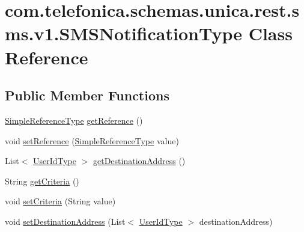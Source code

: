 \hypertarget{classcom_1_1telefonica_1_1schemas_1_1unica_1_1rest_1_1sms_1_1v1_1_1SMSNotificationType}{
\section{com.telefonica.schemas.unica.rest.sms.v1.SMSNotificationType Class Reference}
\label{classcom_1_1telefonica_1_1schemas_1_1unica_1_1rest_1_1sms_1_1v1_1_1SMSNotificationType}
}
\subsection*{Public Member Functions}
\begin{DoxyCompactItemize}
\item 
\hyperlink{classcom_1_1telefonica_1_1schemas_1_1unica_1_1rest_1_1common_1_1v1_1_1SimpleReferenceType}{SimpleReferenceType} \hyperlink{classcom_1_1telefonica_1_1schemas_1_1unica_1_1rest_1_1sms_1_1v1_1_1SMSNotificationType_af181e2de6f1a5d42775cf504e011a833}{getReference} ()
\item 
void \hyperlink{classcom_1_1telefonica_1_1schemas_1_1unica_1_1rest_1_1sms_1_1v1_1_1SMSNotificationType_a8725a0794af6494bb613eb854ce80e11}{setReference} (\hyperlink{classcom_1_1telefonica_1_1schemas_1_1unica_1_1rest_1_1common_1_1v1_1_1SimpleReferenceType}{SimpleReferenceType} value)
\item 
List$<$ \hyperlink{classcom_1_1telefonica_1_1schemas_1_1unica_1_1rest_1_1common_1_1v1_1_1UserIdType}{UserIdType} $>$ \hyperlink{classcom_1_1telefonica_1_1schemas_1_1unica_1_1rest_1_1sms_1_1v1_1_1SMSNotificationType_a57c006b8a367525e5f268d6eef034bcf}{getDestinationAddress} ()
\item 
String \hyperlink{classcom_1_1telefonica_1_1schemas_1_1unica_1_1rest_1_1sms_1_1v1_1_1SMSNotificationType_a6be5e62eeb97eabd7270dac1003ad075}{getCriteria} ()
\item 
void \hyperlink{classcom_1_1telefonica_1_1schemas_1_1unica_1_1rest_1_1sms_1_1v1_1_1SMSNotificationType_ac4598d4f761e5a337f0ab4b478288668}{setCriteria} (String value)
\item 
void \hyperlink{classcom_1_1telefonica_1_1schemas_1_1unica_1_1rest_1_1sms_1_1v1_1_1SMSNotificationType_a5dfd67e67ebe5072e3a56b951105411f}{setDestinationAddress} (List$<$ \hyperlink{classcom_1_1telefonica_1_1schemas_1_1unica_1_1rest_1_1common_1_1v1_1_1UserIdType}{UserIdType} $>$ destinationAddress)
\end{DoxyCompactItemize}
